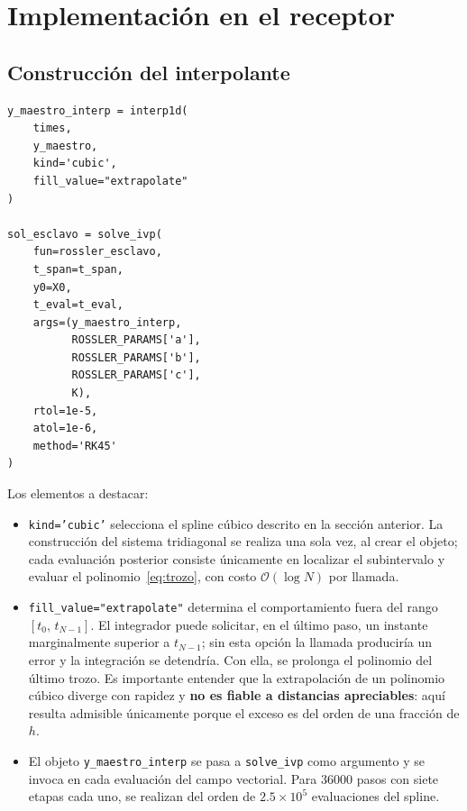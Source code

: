 \documentclass[12pt,a4paper]{article}
\begin{document}
\section{Implementación en el receptor}

\subsection{Construcción del interpolante}

\begin{lstlisting}[caption={Interpolante e integración del sistema esclavo}]
y_maestro_interp = interp1d(
    times,
    y_maestro,
    kind='cubic',
    fill_value="extrapolate"
)

sol_esclavo = solve_ivp(
    fun=rossler_esclavo,
    t_span=t_span,
    y0=X0,
    t_eval=t_eval,
    args=(y_maestro_interp,
          ROSSLER_PARAMS['a'],
          ROSSLER_PARAMS['b'],
          ROSSLER_PARAMS['c'],
          K),
    rtol=1e-5,
    atol=1e-6,
    method='RK45'
)
\end{lstlisting}

Los elementos a destacar:

\begin{itemize}[leftmargin=1.4cm]
	\item \texttt{kind='cubic'} selecciona el spline cúbico descrito en la sección anterior. La construcción del sistema tridiagonal se realiza una sola vez, al crear el objeto; cada evaluación posterior consiste únicamente en localizar el subintervalo y evaluar el polinomio~\eqref{eq:trozo}, con costo $\mathcal{O}(\log N)$ por llamada.

	\item \texttt{fill\_value="extrapolate"} determina el comportamiento fuera del rango $[t_0,\, t_{N-1}]$. El integrador puede solicitar, en el último paso, un instante marginalmente superior a $t_{N-1}$; sin esta opción la llamada produciría un error y la integración se detendría. Con ella, se prolonga el polinomio del último trozo. Es importante entender que la extrapolación de un polinomio cúbico diverge con rapidez y \textbf{no es fiable a distancias apreciables}: aquí resulta admisible únicamente porque el exceso es del orden de una fracción de $h$.

	\item El objeto \texttt{y\_maestro\_interp} se pasa a \texttt{solve\_ivp} como argumento y se invoca en cada evaluación del campo vectorial. Para 36000 pasos con siete etapas cada uno, se realizan del orden de $2.5 \times 10^{5}$ evaluaciones del spline.
\end{itemize}
\end{document}
